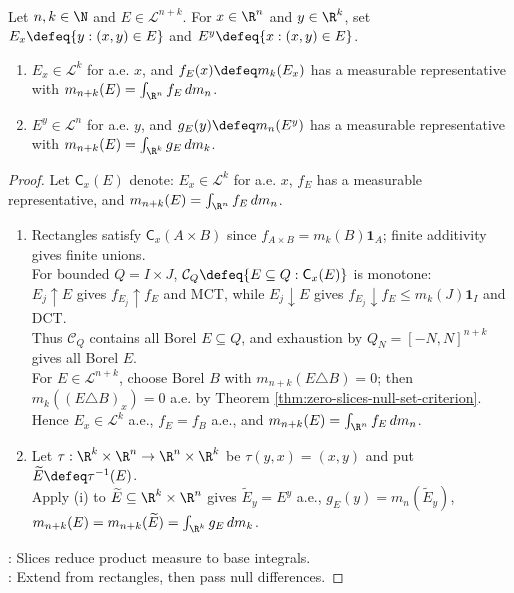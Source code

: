 \begin{theorem} \label{thm:cavalieri-principle-euclidean-slices} \\
Let $n,k\in\N$ and $E\in\mathcal{L}^{n+k}$. For $x\in\R^n$ and $y\in\R^k$, set $E_x\defeq\{y:(x,y)\in E\}$ and $E^y\defeq\{x:(x,y)\in E\}$.
\begin{enumerate}[label=(\roman*)]
\setlength{\itemsep}{0pt}
\item $E_x\in\mathcal{L}^k$ for a.e. $x$, and $f_E(x)\defeq m_k(E_x)$ has a measurable representative with $m_{n+k}(E)=\int_{\R^n}f_E\,dm_n$.
\item $E^y\in\mathcal{L}^n$ for a.e. $y$, and $g_E(y)\defeq m_n(E^y)$ has a measurable representative with $m_{n+k}(E)=\int_{\R^k}g_E\,dm_k$.
\end{enumerate}
\begin{proof} Let $\mathsf C_x(E)$ denote: $E_x\in\mathcal L^k$ for a.e. $x$, $f_E$ has a measurable representative, and $m_{n+k}(E)=\int_{\R^n}f_E\,dm_n$.
\begin{enumerate}[label=(\roman*)]
\setlength{\itemsep}{0pt}
\item Rectangles satisfy $\mathsf C_x(A\times B)$ since $f_{A\times B}=m_k(B)\mathbf{1}_A$; finite additivity gives finite unions.\\
For bounded $Q=I\times J$, $\mathcal C_Q\defeq\{E\subseteq Q:\mathsf C_x(E)\}$ is monotone:\\
$E_j\uparrow E$ gives $f_{E_j}\uparrow f_E$ and MCT, while $E_j\downarrow E$ gives $f_{E_j}\downarrow f_E\leq m_k(J)\mathbf{1}_I$ and DCT.\\
Thus $\mathcal C_Q$ contains all Borel $E\subseteq Q$, and exhaustion by $Q_N=[-N,N]^{n+k}$ gives all Borel $E$.\\
For $E\in\mathcal L^{n+k}$, choose Borel $B$ with $m_{n+k}(E\triangle B)=0$; then $m_k((E\triangle B)_x)=0$ a.e. by Theorem \ref{thm:zero-slices-null-set-criterion}.\\
Hence $E_x\in\mathcal L^k$ a.e., $f_E=f_B$ a.e., and $m_{n+k}(E)=\int_{\R^n}f_E\,dm_n$.
\item Let $\tau:\R^k\times\R^n\to\R^n\times\R^k$ be $\tau(y,x)=(x,y)$ and put $\widetilde E\defeq\tau^{-1}(E)$.\\
Apply (i) to $\widetilde E\subseteq\R^k\times\R^n$ gives $\widetilde E_y=E^y$ a.e., $g_E(y)=m_n(\widetilde E_y)$, $m_{n+k}(E)=m_{n+k}(\widetilde E)=\int_{\R^k}g_E\,dm_k$.
\end{enumerate}
: Slices reduce product measure to base integrals.\\
: Extend from rectangles, then pass null differences.
\end{proof}
\end{theorem}

